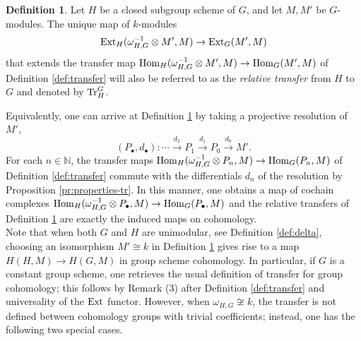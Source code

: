 \documentclass[12pt]{amsart}
\theoremstyle{definition}
\newtheorem{definition}[theorem]{Definition}
\begin{document}
\begin{definition}\label{def:exttransfer}
	Let $H$ be a closed subgroup scheme of $G$, and let $M,M'$ be $G$-modules. The unique map of $k$-modules
	\[
	{\rm Ext}_H(\omega_{H,G}^{-1}\otimes M',M)\rightarrow{\rm Ext}_{G}(M',M)
	\]
	that extends the transfer map ${\rm Hom}_H(\omega_{H,G}^{-1}\otimes M',M)\rightarrow{\rm Hom}_{G}(M',M)$ of Definition \ref{def:transfer} will also be referred to as the {\em relative transfer} from $H$ to $G$ and denoted by ${\rm Tr}_{H}^G$.
\end{definition}


 Equivalently, one can arrive at Definition \ref{def:exttransfer} by taking a projective resolution of $M'$,
\[
(P_\bullet,d_\bullet) \colon \cdots \overset{d_2}{\longrightarrow} P_1\overset{d_1}{\longrightarrow} P_0\overset{d_0}{\longrightarrow} M'.
\]
For each $n\in\mathbb{N}$, the transfer maps $
{\rm Hom}_H(\omega_{H,G}^{-1}\otimes P_{n}, M)\rightarrow  {\rm Hom}_G(P_{n}, M)
$ of Definition \ref{def:transfer} commute with the differentials $d_n$ of the resolution by Proposition \ref{pr:properties-tr}. In this manner, one obtains a map of cochain complexes ${\rm Hom}_H(\omega_{H,G}^{-1}\otimes P_{\bullet}, M)\rightarrow {\rm Hom}_G(P_{\bullet}, M)$ and the relative transfers of Definition \ref{def:exttransfer} are exactly the induced maps on cohomology.\\

Note that when both $G$ and $H$ are unimodular, see Definition \ref{def:delta},  choosing an isomorphism $M' \cong k$ in Definition \ref{def:exttransfer} gives rise to a map $H(H,M)\rightarrow H(G,M)$ in group scheme cohomology. In particular, if $G$ is a constant group scheme, one retrieves the usual definition of transfer for group cohomology; this follows by Remark (3) after Definition \ref{def:transfer} and universality of the ${\rm Ext}$ functor. However, when $\omega_{H,G}\not \cong  k$, the transfer is not defined between cohomology groups with trivial coefficients; instead, one has the following two special cases.
\end{document}

